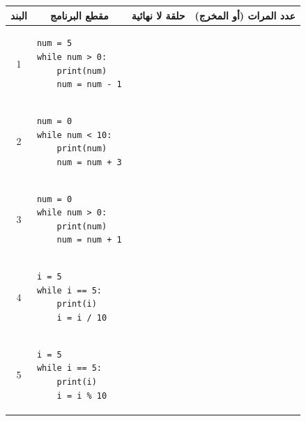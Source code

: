 \documentclass[14pt]{extarticle}
\begin{document}
{\small
\renewcommand{\arraystretch}{1.3}
\begin{longtable}{|c|p{}|p{}|p{}|}
\hline
\multicolumn{1}{|c|}{\textbf{البند}} & \multicolumn{1}{c|}{\textbf{مقطع البرنامج}} & \multicolumn{1}{c|}{\textbf{حلقة لا نهائية}} & \multicolumn{1}{c|}{\textbf{عدد المرات (أو المخرج)}} \\
\hline
\endhead
1 &
\begin{pycell}
\begin{english}
\begin{verbatim}
num = 5
while num > 0:
    print(num)
    num = num - 1
\end{verbatim}
\end{english}
\end{pycell} & \rule{0pt}{1.7cm} & \\
\hline
2 &
\begin{pycell}
\begin{english}
\begin{verbatim}
num = 0
while num < 10:
    print(num)
    num = num + 3
\end{verbatim}
\end{english}
\end{pycell} & \rule{0pt}{1.7cm} & \\
\hline
3 &
\begin{pycell}
\begin{english}
\begin{verbatim}
num = 0
while num > 0:
    print(num)
    num = num + 1
\end{verbatim}
\end{english}
\end{pycell} & \rule{0pt}{1.7cm} & \\
\hline
4 &
\begin{pycell}
\begin{english}
\begin{verbatim}
i = 5
while i == 5:
    print(i)
    i = i / 10
\end{verbatim}
\end{english}
\end{pycell} & \rule{0pt}{1.7cm} & \\
\hline
5 &
\begin{pycell}
\begin{english}
\begin{verbatim}
i = 5
while i == 5:
    print(i)
    i = i % 10
\end{verbatim}
\end{english}
\end{pycell} & \rule{0pt}{1.7cm} & \\
\hline
\end{longtable}
}
\end{document}
